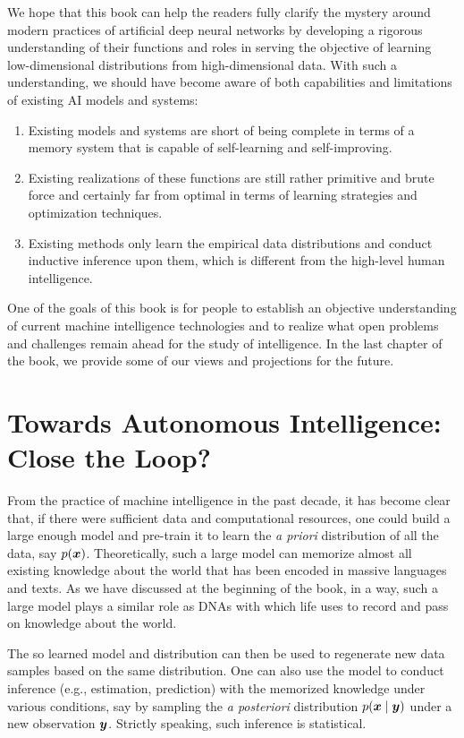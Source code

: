 \documentclass[\toplevelprefix/book-main.tex]{subfiles}
\begin{document}
We hope that this book can help the readers fully clarify the mystery around modern practices of artificial deep neural networks by developing a rigorous understanding of their functions and roles in serving the objective of learning low-dimensional distributions from high-dimensional data. With such a understanding, we should have become aware of both capabilities and limitations of existing AI models and systems: 
\begin{enumerate}
    \item Existing models and systems are short of being complete in terms of a memory system that is capable of self-learning and self-improving.
    \item Existing realizations of these functions are still rather primitive and brute force and certainly far from optimal in terms of learning strategies and optimization techniques. 
    \item Existing methods only learn the empirical data distributions and conduct inductive inference upon them, which is different from the high-level human intelligence.
\end{enumerate} 

One of the goals of this book is for people to establish an objective understanding of current machine intelligence technologies and to realize what open problems and challenges remain ahead for the study of intelligence. In the last chapter of the book, we provide some of our views and projections for the future. 

\section{Towards Autonomous Intelligence: Close the Loop?}
From the practice of machine intelligence in the past decade, it has become clear that, if there were sufficient data and computational resources, one could build a large enough model and pre-train it to learn the {\em a priori} distribution of all the data, say $p(\bm{x})$. Theoretically, such a large model can memorize almost all existing knowledge about the world that has been encoded in massive languages and texts. As we have discussed at the beginning of the book, in a way, such a large model plays a similar role as DNAs with which life uses to record and pass on knowledge about the world.  

The so learned model and distribution can then be used to regenerate new data samples based on the same distribution. One can also use the model to conduct inference (e.g., estimation, prediction) with the memorized knowledge under various conditions, say by sampling the {\em a posteriori} distribution $p(\bm{x}\mid \bm{y})$ under a new observation $\bm{y}$. Strictly speaking, such inference is statistical. 
\end{document}
